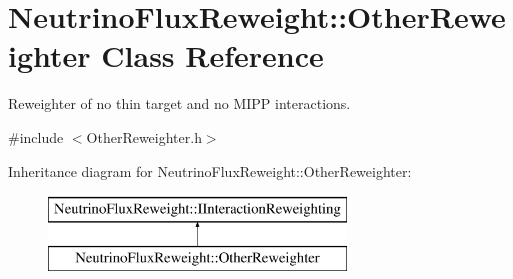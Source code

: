 \hypertarget{class_neutrino_flux_reweight_1_1_other_reweighter}{\section{Neutrino\-Flux\-Reweight\-:\-:Other\-Reweighter Class Reference}
\label{class_neutrino_flux_reweight_1_1_other_reweighter}
}


Reweighter of no thin target and no M\-I\-P\-P interactions.  




{\ttfamily \#include $<$Other\-Reweighter.\-h$>$}

Inheritance diagram for Neutrino\-Flux\-Reweight\-:\-:Other\-Reweighter\-:\begin{figure}[H]
\begin{center}
\leavevmode
\includegraphics[height=2.000000cm]{class_neutrino_flux_reweight_1_1_other_reweighter}
\end{center}
\end{figure}
